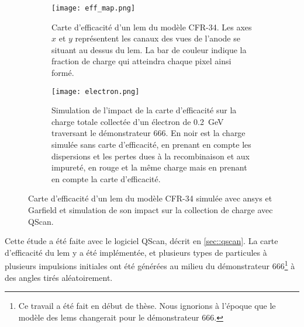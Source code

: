             \begin{figure}[htpb]
                \begin{subfigure}{0.48\textwidth}
                    \texttt{[image: eff\_map.png]}
                    \caption{Carte d'efficacité d'un \gls{lem} du modèle CFR-34. Les axes $x$ et $y$ représentent les  canaux des vues de l'anode se situant au dessus du \gls{lem}. La bar de couleur indique la fraction de charge qui atteindra chaque pixel ainsi formé.
                    \label{fig::eff_map}}
                \end{subfigure}
                \hfill
                \begin{subfigure}{0.48\textwidth}
                    \texttt{[image: electron.png]}
                    \caption[Simulation de l'impact de la carte d'efficacité sur la charge totale collectée d'un électron de \SI{0.2}{\giga\electronvolt}]{Simulation de l'impact de la carte d'efficacité sur la charge totale collectée d'un électron de \SI{0.2}{\giga\electronvolt} traversant le démonstrateur 666. En noir est la charge simulée sans carte d'efficacité, en prenant en compte les dispersions et les pertes dues à la recombinaison et aux impureté, en rouge et la même charge mais en prenant en compte la carte d'efficacité.
                    \label{fig::electron}}
                \end{subfigure}
                \caption[Carte d'efficacité d'un \gls{lem} du modèle CFR-34 et impact sur la collection de charge.]{Carte d'efficacité d'un \gls{lem} du modèle CFR-34 simulée avec \gls{ansys} et Garfield et simulation de son impact sur la collection de charge avec QScan.}
            \end{figure}
        
            Cette étude a été faite avec le logiciel QScan, décrit en \autoref{sec::qscan}. La carte d'efficacité du \gls{lem} y a été implémentée, et plusieurs types de particules à plusieurs impulsions initiales ont été générées au milieu du démonstrateur 666\footnote{Ce travail a été fait en début de thèse. Nous ignorions à l'époque que le modèle des \glspl{lem} changerait pour le démonstrateur 666.} à des angles tirés aléatoirement.
            
